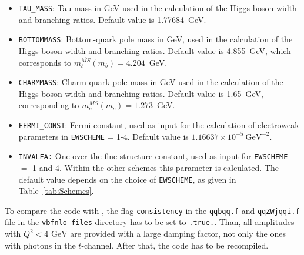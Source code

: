 \documentclass[a4paper,11pt]{article}
\begin{document}
\begin{itemize}
\item {\tt TAU\_MASS}: Tau mass in GeV used in the calculation of the Higgs boson
width and branching ratios. Default value is 1.77684~GeV. 
\item {\tt BOTTOMMASS}: Bottom-quark pole mass in GeV, used in the calculation
of the Higgs boson width and branching ratios. Default value is
4.855~GeV, which corresponds to $m_{b}^{\overline{MS}}(m_{b}) = 4.204$~GeV.
\item {\tt CHARMMASS}: Charm-quark pole mass in GeV used in the calculation of
the Higgs boson width and branching ratios. Default value is 1.65~GeV,
corresponding to $m_{c}^{\overline{MS}}(m_{c}) = 1.273$~GeV.
\item {\tt FERMI\_CONST}: Fermi constant, used as input for the calculation of
electroweak parameters in {\tt EWSCHEME} = 1-4. Default value is $1.16637 \times
10^{-5} \ \mathrm{GeV}^{-2}$. 
\item {\tt INVALFA:} One over the fine structure constant, used as input for
{\tt EWSCHEME} $=$ 1 and 4.  Within the other schemes this parameter is
calculated. The default value depends on the choice of {\tt EWSCHEME}, as given
in Table~\ref{tab:Schemes}.
\end{itemize} 
To compare the code with \cite{JSZ}, the flag {\tt consistency} in the {\tt qqbqq.f} and 
{\tt qqZWjqqi.f} file in the {\tt vbfnlo-files} directory has to be set to {\tt .true.}. 
Than, all amplitudes with $Q^2<4 \text{~GeV}$ are provided with a large damping factor, not 
only the ones with photons in the $t$-channel. After that, the code has to be recompiled.
\end{document}

